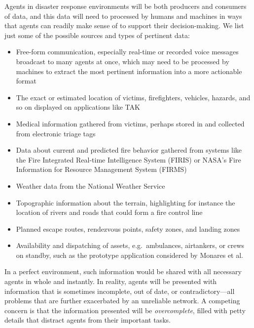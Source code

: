 \documentclass[]             %
{NASA}                       %
\theoremstyle{definition}
\begin{document}
Agents in disaster response environments will be both producers and
consumers of data, and this data will need to processed by humans and
machines in ways that agents can readily make sense of to support
their decision-making. We list just some of the possible sources and
types of pertinent data:
\begin{itemize}
\item Free-form communication, especially real-time or recorded voice messages
  broadcast to many agents at once, which may need to be processed by
  machines to extract the most pertinent information into a more
  actionable format
\item The exact or estimated location of victims, firefighters,
  vehicles, hazards, and so on displayed on applications like TAK
\item Medical information gathered from victims, perhaps stored in and
  collected from electronic triage tags \cite{2009:triagetag}
\item Data about current and predicted fire behavior gathered from
  systems like the Fire Integrated Real-time Intelligence System
  (FIRIS) or NASA's Fire Information for Resource Management System
  (FIRMS)
\item Weather data from the National Weather Service
\item Topographic information about the terrain, highlighting for
  instance the location of rivers and roads that could form a fire
  control line
\item Planned escape routes, rendezvous points, safety zones, and
  landing zones
\item Availability and dispatching of assets, e.g.~ambulances,
  airtankers, or crews on standby, such as the prototype application
  considered by Monares et al. \cite{2011:monares}
\end{itemize}
In a perfect environment, such information would be shared with all
necessary agents in whole and instantly. In reality, agents will be
presented with information that is sometimes incomplete, out of date,
or contradictory---all problems that are further exacerbated by an
unreliable network. A competing concern is that the information
presented will be \emph{overcomplete}, filled with petty details that
distract agents from their important tasks.
\end{document}
